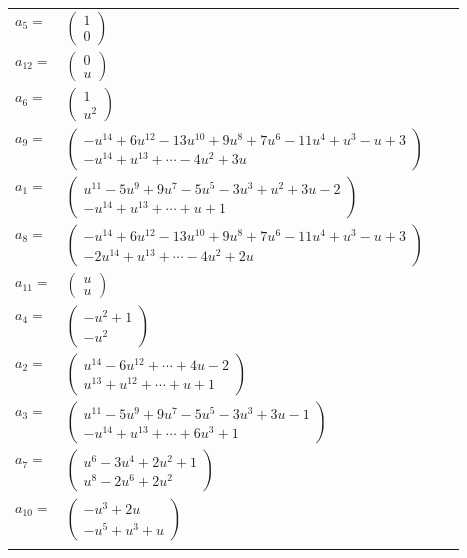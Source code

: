 \documentclass[1p]{elsarticle_modified}
\theoremstyle{definition}
\begin{document}
\begin{tabular}{m{7pt} m{180pt} m{7pt} m{180pt} }
\flushright $a_{5}=$&$\begin{pmatrix}1\\0\end{pmatrix}$ \\
\flushright $a_{12}=$&$\begin{pmatrix}0\\u\end{pmatrix}$ \\
\flushright $a_{6}=$&$\begin{pmatrix}1\\u^2\end{pmatrix}$ \\
\flushright $a_{9}=$&$\begin{pmatrix}- u^{14}+6 u^{12}-13 u^{10}+9 u^8+7 u^6-11 u^4+u^3- u+3\\- u^{14}+u^{13}+\cdots-4 u^2+3 u\end{pmatrix}$ \\
\flushright $a_{1}=$&$\begin{pmatrix}u^{11}-5 u^9+9 u^7-5 u^5-3 u^3+u^2+3 u-2\\- u^{14}+u^{13}+\cdots+u+1\end{pmatrix}$ \\
\flushright $a_{8}=$&$\begin{pmatrix}- u^{14}+6 u^{12}-13 u^{10}+9 u^8+7 u^6-11 u^4+u^3- u+3\\-2 u^{14}+u^{13}+\cdots-4 u^2+2 u\end{pmatrix}$ \\
\flushright $a_{11}=$&$\begin{pmatrix}u\\u\end{pmatrix}$ \\
\flushright $a_{4}=$&$\begin{pmatrix}- u^2+1\\- u^2\end{pmatrix}$ \\
\flushright $a_{2}=$&$\begin{pmatrix}u^{14}-6 u^{12}+\cdots+4 u-2\\u^{13}+u^{12}+\cdots+u+1\end{pmatrix}$ \\
\flushright $a_{3}=$&$\begin{pmatrix}u^{11}-5 u^9+9 u^7-5 u^5-3 u^3+3 u-1\\- u^{14}+u^{13}+\cdots+6 u^3+1\end{pmatrix}$ \\
\flushright $a_{7}=$&$\begin{pmatrix}u^6-3 u^4+2 u^2+1\\u^8-2 u^6+2 u^2\end{pmatrix}$ \\
\flushright $a_{10}=$&$\begin{pmatrix}- u^3+2 u\\- u^5+u^3+u\end{pmatrix}$\\&\end{tabular}
\end{document}
